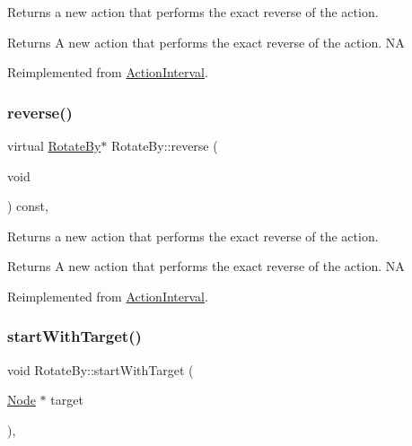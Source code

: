 Returns a new action that performs the exact reverse of the action.

\begin{DoxyReturn}{Returns}
A new action that performs the exact reverse of the action.  NA 
\end{DoxyReturn}


Reimplemented from \hyperlink{classActionInterval_a9f9ac7164036a0bc261a72f62a2b2da7}{Action\+Interval}.

\mbox{\label{classRotateBy_aa04dbf8b2b38410ba025fed3d23d4f67}} 
\subsubsection{\texorpdfstring{reverse()}{reverse()}\hspace{0.1cm}{\footnotesize\ttfamily [2/2]}}
{\footnotesize\ttfamily virtual \hyperlink{classRotateBy}{Rotate\+By}$\ast$ Rotate\+By\+::reverse (\begin{DoxyParamCaption}\item[{void}]{ }\end{DoxyParamCaption}) const\hspace{0.3cm}{\ttfamily [override]}, {\ttfamily [virtual]}}

Returns a new action that performs the exact reverse of the action.

\begin{DoxyReturn}{Returns}
A new action that performs the exact reverse of the action.  NA 
\end{DoxyReturn}


Reimplemented from \hyperlink{classActionInterval_a9f9ac7164036a0bc261a72f62a2b2da7}{Action\+Interval}.

\mbox{\label{classRotateBy_aaad515a54f706e1b5a9e6f17beb2371a}} 
\subsubsection{\texorpdfstring{start\+With\+Target()}{startWithTarget()}\hspace{0.1cm}{\footnotesize\ttfamily [1/2]}}
{\footnotesize\ttfamily void Rotate\+By\+::start\+With\+Target (\begin{DoxyParamCaption}\item[{\hyperlink{classNode}{Node} $\ast$}]{target }\end{DoxyParamCaption})\hspace{0.3cm}{\ttfamily [override]}, {\ttfamily [virtual]}}

